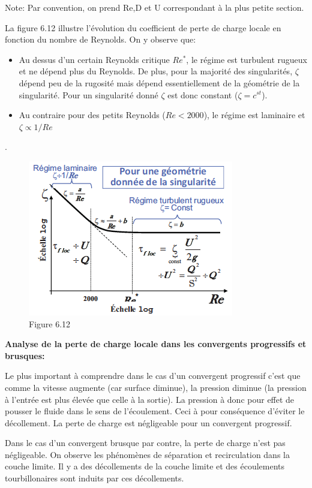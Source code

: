 Note: Par convention, on prend Re,D et U correspondant à la plus petite section.
\pagebreak 

La figure 6.12 illustre l'évolution du coefficient de perte de charge locale en fonction du nombre de Reynolds. On y observe que:
\begin{itemize}
\item Au dessus d’un certain Reynolds critique $Re^*$, le régime est turbulent rugueux et ne dépend plus du Reynolds. De plus, pour la majorité des singularités,  $\zeta$ dépend peu de la rugosité mais dépend essentiellement de la géométrie de la singularité. Pour un singularité donné $\zeta$ est donc constant ($\zeta=c^{st}$).
\item Au contraire pour des petits Reynolds ($Re<2000$), le régime est laminaire et $\zeta \propto 1/Re$
\end{itemize}.

\begin{figure}[H]
\begin{center}
\includegraphics[scale=0.5]{ch6/73.png}
\caption*{Figure 6.12}
\end{center}
\end{figure}

\textbf{Analyse de la perte de charge locale dans les convergents progressifs et brusques:}

Le plus important à comprendre dans le cas d'un convergent progressif c'est que comme la vitesse augmente (car surface diminue), la pression diminue (la pression à l'entrée est plus élevée que celle à la sortie). La pression à donc pour effet de \og pousser \fg{} le fluide dans le sens de l'écoulement. Ceci à pour conséquence d'éviter le décollement. La perte de charge est négligeable pour un convergent progressif.

Dans le cas d'un convergent brusque par contre, la perte de charge n'est pas négligeable. On observe les phénomènes de séparation et recirculation dans la couche limite. Il y a des décollements de la couche limite et des écoulements tourbillonaires sont induits par ces décollements.

